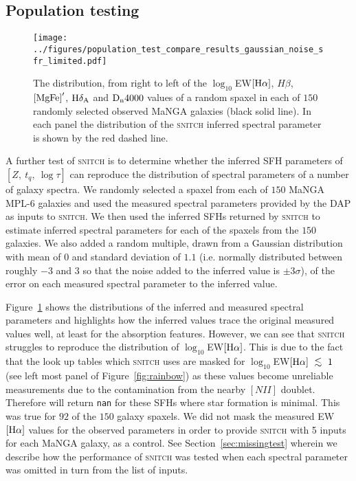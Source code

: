 \documentclass[useAMS,usenatbib]{mn2e}
\def\lesssim{\mathrel{\hbox{\rlap{\hbox{\lower3pt\hbox{$\sim$}}}\hbox{\raise2pt\hbox{$<$}}}}}
\begin{document}
\subsection{Population testing}\label{sec:poptest}

\begin{figure*}
\centering
\texttt{[image: ../figures/population\_test\_compare\_results\_gaussian\_noise\_sfr\_limited.pdf]}
\caption{The distribution, from right to left of the $\log_{10}$EW$[\rm{H}\alpha]$, $H\beta$, $\rm{[MgFe]}^{\prime}$, $\rm{H}\delta_A$ and $\rm{D_n4000}$ values of a random spaxel in each of $150$ randomly selected observed MaNGA galaxies (black solid line). In each panel the distribution of the \textsc{snitch} inferred spectral parameter is shown by the red dashed line.}
\label{fig:mangacompare}
\end{figure*}


A further test of \textsc{snitch} is to determine whether the inferred SFH parameters of $[Z,~t_q,~\log\tau]$ can reproduce the distribution of spectral parameters of a number of galaxy spectra. We randomly selected a spaxel from each of $150$ MaNGA MPL-6 galaxies  and used the measured spectral parameters provided by the DAP as inputs to \textsc{snitch}. We then used the inferred SFHs returned by \textsc{snitch} to estimate inferred spectral parameters for each of the spaxels from the $150$ galaxies. We also added a random multiple, drawn from a Gaussian distribution with mean of $0$ and standard deviation of $1.1$ (i.e. normally distributed between roughly $-3$ and $3$ so that the noise added to the inferred value is $\pm3\sigma$), of the error on each measured spectral parameter to the inferred value.

Figure~\ref{fig:mangacompare} shows the distributions of the inferred and measured spectral parameters and highlights how the inferred values trace the original measured values well, at least for the absorption features. However, we can see that \textsc{snitch} struggles to reproduce the distribution of $\log_{10}$EW$[\rm{H}\alpha]$. This is due to the fact that the look up tables which \textsc{snitch} uses are masked for $\log_{10}$EW$[\rm{H}\alpha]~\lesssim~1$ (see left most panel of Figure~\ref{fig:rainbow}) as these values become unreliable measurements due to the contamination from the nearby $[NII]$ doublet. Therefore  will return \texttt{nan} for these SFHs where star formation is minimal. This was true for $92$ of the $150$ galaxy spaxels. We did not mask the measured EW$[\rm{H}\alpha]$ values for the observed parameters in order to provide \textsc{snitch} with 5 inputs for each MaNGA galaxy, as a control. See Section~\ref{sec:missingtest} wherein we describe how the performance of \textsc{snitch} was tested when each spectral parameter was omitted in turn from the list of inputs. 
\end{document}
